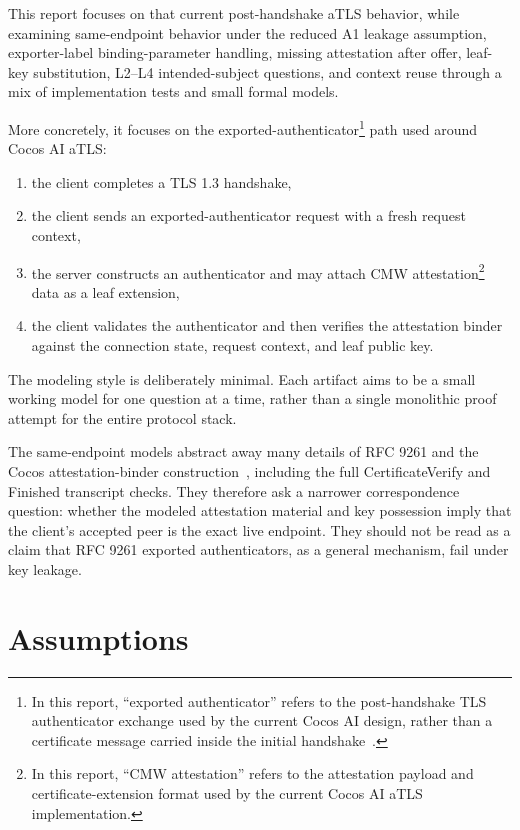 \documentclass[11pt,a4paper]{article}
\begin{document}
This report focuses on that current post-handshake aTLS behavior, while
examining same-endpoint behavior under the reduced A1 leakage assumption,
exporter-label binding-parameter handling, missing attestation after offer,
leaf-key substitution, L2--L4 intended-subject questions, and context reuse
through a mix of implementation tests and small formal models.

More concretely, it focuses on the exported-authenticator\footnote{In this
report, ``exported authenticator'' refers to the post-handshake TLS
authenticator exchange used by the current Cocos AI design, rather than a
certificate message carried inside the initial handshake~\cite{rfc9261}.} path used around
Cocos AI aTLS:

\begin{enumerate}
\item the client completes a TLS 1.3 handshake,
\item the client sends an exported-authenticator request with a fresh request
context,
\item the server constructs an authenticator and may attach CMW
attestation\footnote{In this report, ``CMW attestation'' refers to the
attestation payload and certificate-extension format used by the current Cocos
AI aTLS implementation.} data as a leaf extension,
\item the client validates the authenticator and then verifies the attestation
binder against the connection state, request context, and leaf public key.
\end{enumerate}

The modeling style is deliberately minimal. Each artifact aims to be a small
working model for one question at a time, rather than a single monolithic proof
attempt for the entire protocol stack.

The same-endpoint models abstract away many details of RFC 9261 and the Cocos
attestation-binder construction~\cite{rfc9261}, including the full
CertificateVerify and Finished transcript checks. They therefore ask a
narrower correspondence question:
whether the modeled attestation material and key possession imply that the
client's accepted peer is the exact live endpoint. They should not be read as
a claim that RFC 9261 exported authenticators, as a general mechanism, fail
under key leakage.

\section{Assumptions}
\end{document}
